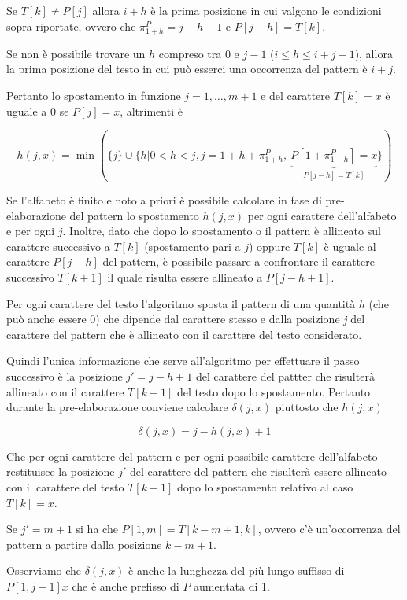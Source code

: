 Se $ T[k] \neq P[j] $ allora $ i+h $ è la prima posizione in cui valgono le condizioni sopra riportate, ovvero che $ \pi_{1+h}^P = j - h -1 $ e $ P[j-h] = T[k] $.

Se non è possibile trovare un $ h $ compreso tra $ 0 $ e $ j-1 $ ($ i \leq h \leq i+j-1 $), allora la prima posizione del testo in cui può esserci una occorrenza del pattern è $ i+j $.

Pertanto lo spostamento in funzione $ j = 1, \ldots, m +1 $ e del carattere $ T[k] = x $ è uguale a 0 se $ P[j] = x $, altrimenti è 

$$
h(j,x) = \min(\{j\} \cup \{h | 0 < h < j, j = 1+h + \pi_{1+h}^P, \: \underbrace{P[ 1+ \pi_{1+h}^P] = x}_{P[j-h] = T[k]}\})
$$

Se l'alfabeto è finito e noto a priori è possibile calcolare in fase di pre-elaborazione del pattern lo spostamento $ h(j,x) $ per ogni carattere dell'alfabeto e per ogni $ j $.
Inoltre, dato che dopo lo spostamento o il pattern è allineato sul carattere successivo a $ T[k] $ (spostamento pari a $ j $) oppure $ T[k] $ è uguale al carattere $ P[j-h] $ del pattern, è possibile passare a confrontare il carattere successivo $ T[k+1] $ il quale risulta essere allineato a $ P[j-h+1] $.
 
Per ogni carattere del testo l'algoritmo sposta il pattern di una quantità $ h $ (che può anche essere 0) che dipende dal carattere stesso e dalla posizione \textit{j} del carattere del pattern che è allineato con il carattere del testo considerato.

Quindi l'unica informazione che serve all'algoritmo per effettuare il passo successivo è la posizione $ j' = j - h+ 1 $ del carattere del pattter che risulterà allineato con il carattere $ T[k+1] $ del testo dopo lo spostamento. Pertanto durante la pre-elaborazione conviene calcolare $ \delta(j,x) $ piuttosto che $ h(j,x) $

$$
\delta(j,x) = j - h(j,x)+1
$$

Che per ogni carattere del pattern e per ogni possibile carattere dell'alfabeto restituisce la posizione $ j' $ del carattere del pattern che risulterà essere allineato con il carattere del testo $ T[k+1] $ dopo lo spostamento relativo al caso $ T[k] = x $.

Se $ j' =m+1 $ si ha che $ P[1,m] = T[k-m+1,k] $, ovvero c'è un'occorrenza del pattern a partire dalla posizione $ k -m+1 $.

Osserviamo che $ \delta(j,x) $ è anche la lunghezza del più lungo suffisso di $ P[1,j-1]x $ che è anche prefisso di $ P $ aumentata di 1.

